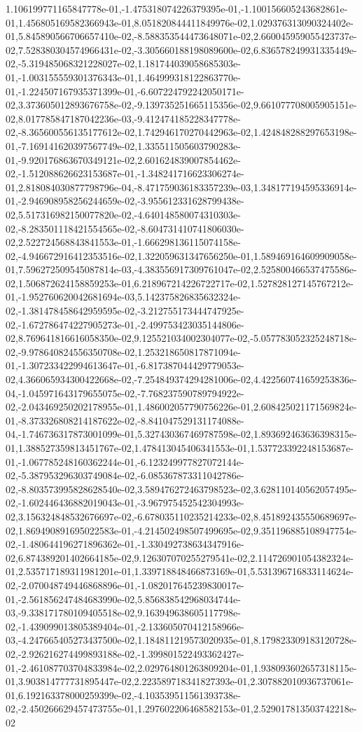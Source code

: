 1.106199771165847778e-01,-1.475318074226379395e-01,-1.100156605243682861e-01,1.456805169582366943e-01,8.051820844411849976e-02,1.029376313090324402e-01,5.845890566706657410e-02,-8.588353544473648071e-02,2.660045959055423737e-02,7.528380304574966431e-02,-3.305660188198089600e-02,6.836578249931335449e-02,-5.319485068321228027e-02,1.181744039058685303e-01,-1.003155559301376343e-01,1.464999318122863770e-01,-1.224507167935371399e-01,-6.607224792242050171e-02,3.373605012893676758e-02,-9.139735251665115356e-02,9.661077708005905151e-02,8.017785847187042236e-03,-9.412474185228347778e-02,-8.365600556135177612e-02,1.742946170270442963e-02,1.424848288297653198e-01,-7.169141620397567749e-02,1.335511505603790283e-01,-9.920176863670349121e-02,2.601624839007854462e-02,-1.512088626623153687e-01,-1.348241716623306274e-01,2.818084030877798796e-04,-8.471759036183357239e-03,1.348177194595336914e-01,-2.946908958256244659e-02,-3.955612331628799438e-02,5.517316982150077820e-02,-4.640148580074310303e-02,-8.283501118421554565e-02,-8.604731410741806030e-02,2.522724568843841553e-01,-1.666298136115074158e-02,-4.946672916412353516e-02,1.322059631347656250e-01,1.589469164609909058e-01,7.596272509545087814e-03,-4.383556917309761047e-02,2.525800466537475586e-02,1.506872624158859253e-01,6.218967214226722717e-02,1.527828127145767212e-01,-1.952760620042681694e-03,5.142375826835632324e-02,-1.381478458642959595e-02,-3.212755173444747925e-02,-1.672786474227905273e-01,-2.499753423035144806e-02,8.769641816616058350e-02,9.125521034002304077e-02,-5.057783052325248718e-02,-9.978640824556350708e-02,1.253218650817871094e-01,-1.307233422994613647e-01,-6.817387044429779053e-02,4.366065934300422668e-02,-7.254849374294281006e-02,4.422560741659253836e-04,-1.045971643179655075e-02,-7.768237590789794922e-02,-2.043469250202178955e-01,1.486002057790756226e-01,2.608425021171569824e-01,-8.373326808214187622e-02,-8.841047529131174088e-04,-1.746736317873001099e-01,5.327430367469787598e-02,1.893692463636398315e-01,1.388527359813451767e-02,1.478413045406341553e-01,1.537723392248153687e-01,-1.067785248160362244e-01,-6.123249977827072144e-02,-5.387953296303749084e-02,-6.085367873311042786e-02,-8.803573995828628540e-02,3.589476272463798523e-02,3.628110140562057495e-02,-1.602446436882019043e-01,-3.967975452542304993e-02,3.156324848532676697e-02,-6.678035110235214233e-02,8.451892435550689697e-02,1.869490891695022583e-01,-4.214502498507499695e-02,9.351196885108947754e-02,-1.480644196271896362e-01,-1.330492738634347916e-02,6.874389201402664185e-02,9.126307070255279541e-02,2.114726901054382324e-01,2.535717189311981201e-01,1.339718848466873169e-01,5.531396716833114624e-02,-2.070048749446868896e-01,-1.082017645239830017e-01,-2.561856247484683990e-02,5.856838542968034744e-03,-9.338171780109405518e-02,9.163949638605117798e-02,-1.439099013805389404e-01,-2.133605070412158966e-03,-4.247665405273437500e-02,1.184811219573020935e-01,8.179823309183120728e-02,-2.926216274499893188e-02,-1.399801522493362427e-01,-2.461087703704833984e-02,2.029764801263809204e-01,1.938093602657318115e-01,3.903814777731895447e-02,2.223589718341827393e-01,2.307882010936737061e-01,6.192163378000259399e-02,-4.103539511561393738e-02,-2.450266629457473755e-01,1.297602206468582153e-01,2.529017813503742218e-02
